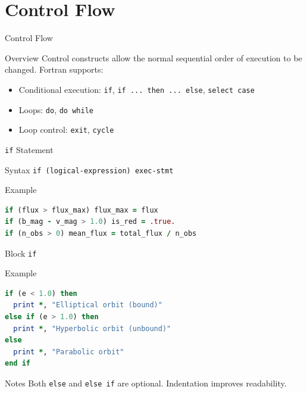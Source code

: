 \section{Control Flow}

\begin{frame}{Control Flow}
  \begin{block}{Overview}
    Control constructs allow the normal sequential order of execution to be changed. Fortran supports:
    \begin{itemize}
      \item Conditional execution: \texttt{if}, \texttt{if ... then ... else}, \texttt{select case}
      \item Loops: \texttt{do}, \texttt{do while}
      \item Loop control: \texttt{exit}, \texttt{cycle}
    \end{itemize}
  \end{block}
\end{frame}

\begin{frame}[fragile]{\texttt{if} Statement}
  \begin{block}{Syntax}
    \texttt{if (logical-expression) exec-stmt}
  \end{block}
  \begin{block}{Example}
\begin{lstlisting}[language=Fortran]
if (flux > flux_max) flux_max = flux
if (b_mag - v_mag > 1.0) is_red = .true.
if (n_obs > 0) mean_flux = total_flux / n_obs
\end{lstlisting}
  \end{block}
\end{frame}

\begin{frame}[fragile]{Block \texttt{if}}
  \begin{block}{Example}
\begin{lstlisting}[language=Fortran]
if (e < 1.0) then
  print *, "Elliptical orbit (bound)"
else if (e > 1.0) then
  print *, "Hyperbolic orbit (unbound)"
else
  print *, "Parabolic orbit"
end if
\end{lstlisting}
  \end{block}
  \begin{block}{Notes}
    Both \texttt{else} and \texttt{else if} are optional. Indentation improves readability.
  \end{block}
\end{frame}

